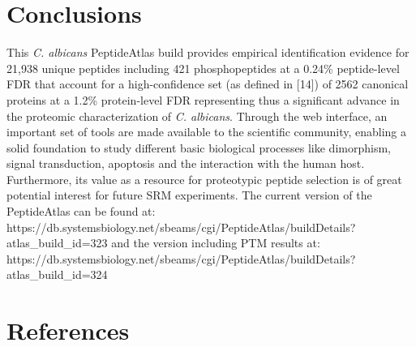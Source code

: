 \section*{Conclusions}

This \textit{C. albicans} PeptideAtlas build provides empirical identification
 evidence for 21,938 unique peptides including 421
phosphopeptides at a 0.24\% peptide-level FDR that account for a
high-confidence set (as defined in [14]) of 2562 canonical proteins
at a 1.2\% protein-level FDR representing thus a significant
advance in the proteomic characterization of \textit{C. albicans}.
Through the web interface, an important set of tools are
made available to the scientific community, enabling a solid
foundation to study different basic biological processes like
dimorphism, signal transduction, apoptosis and the interaction
with the human host. Furthermore, its value as a resource for
proteotypic peptide selection is of great potential interest for
future SRM experiments.
The current version of the PeptideAtlas can be found
at: 
https://db.systemsbiology.net/sbeams/cgi/PeptideAtlas/buildDetails?atlas\_build\_id=323
and the version including PTM results at:\newline{}
https://db.systemsbiology.net/sbeams/cgi/PeptideAtlas/buildDetails?atlas\_build\_id=324


\section*{References}

